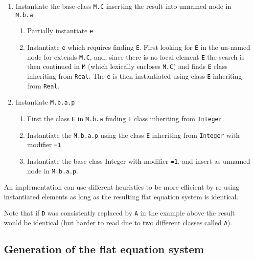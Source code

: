 \begin{example}
\begin{enumerate}
\begin{enumerate}
\begin{enumerate}
\begin{enumerate}
      \end{enumerate}
    \end{enumerate}
  \end{enumerate}
\item
  Instantiate the base-class \lstinline!M.C! inserting the result into unnamed node in \lstinline!M.b.a!
  \begin{enumerate}
  \item
    Partially instantiate \lstinline!e!
  \item
    Instantiate \lstinline!e! which requires finding \lstinline!E!.  First looking for \lstinline!E! in the un-named node for extends \lstinline!M.C!, and, since there is
    no local element \lstinline!E! the search is then continued in \lstinline!M! (which lexically encloses \lstinline!M.C!) and finds \lstinline!E! class inheriting from
    \lstinline!Real!.  The \lstinline!e! is then instantiated using class \lstinline!E! inheriting from \lstinline!Real!.
  \end{enumerate}
\item
  Instantiate \lstinline!M.b.a.p!
  \begin{enumerate}
  \item
    First the class \lstinline!E! in \lstinline!M.b.a! finding \lstinline!E! class inheriting from \lstinline!Integer!.
  \item
    Instantiate the \lstinline!M.b.a.p! using the class \lstinline!E! inheriting from \lstinline!Integer! with modifier \lstinline!=1!
  \item
    Instantiate the base-class Integer with modifier \lstinline!=1!, and insert as unnamed node in \lstinline!M.b.a.p!.
  \end{enumerate}
\end{enumerate}

An implementation can use different heuristics to be more efficient by re-using instantiated elements as long as the resulting flat equation system is identical.

Note that if \lstinline!D! was consistently replaced by \lstinline!A! in the example above the result would be identical (but harder to read due to two different
classes called \lstinline!A!).
\end{example}

\subsection{Generation of the flat equation system}

